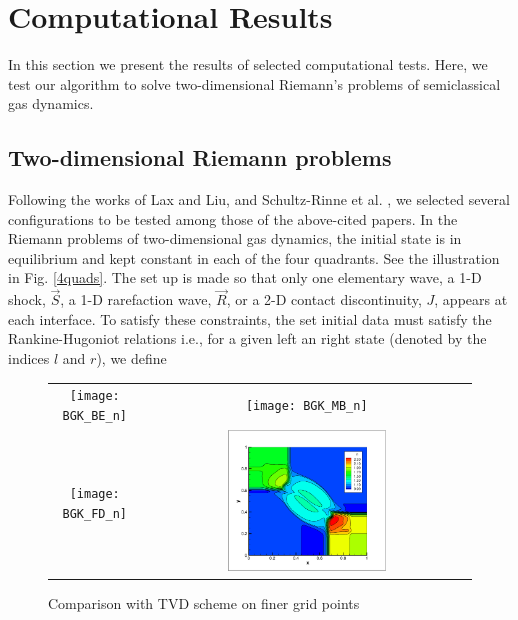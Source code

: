 \documentclass{rsproca}%
\begin{document}
\section{Computational Results}
\label{results}

In this section we present the results of selected computational tests.  Here, we test our algorithm to solve two-dimensional Riemann's problems of semiclassical gas dynamics.

\subsection{Two-dimensional Riemann problems}
\label{Riemannp}
Following the works of Lax and Liu, \cite{Laxliu95} and Schultz-Rinne et al. \cite{schultzrinne}, we selected several configurations to be tested among those of the above-cited papers. In the Riemann problems of two-dimensional gas dynamics, the initial state is in equilibrium and kept constant in each of the four quadrants. See the illustration in Fig. \ref{4quads}. The set up is made so that only one elementary wave, a 1-D  shock, $\vec{S}$, a 1-D rarefaction wave, $\vec{R}$, or a 2-D contact discontinuity, $J$, appears at each interface.
To satisfy these constraints, the set initial data must satisfy the Rankine-Hugoniot relations i.e., for a given left an right state (denoted by the indices $l$ and $r$), we define


\begin{figure}[hbt]
\centering
\begin{tabular}{cc}
\texttt{[image: BGK\_BE\_n]} \label{TVDp} & 
\texttt{[image: BGK\_MB\_n]} \label{WENOp} \\
\texttt{[image: BGK\_FD\_n]} \label{TVDp2} & 
\includegraphics[trim = 10mm 10mm 20mm 20mm,clip,width=0.5\textwidth]{ESBGK_MB_n} \label{WENOp2}
\end{tabular}
\caption{Comparison with TVD scheme on finer grid points}
\label{WENOTVD2D}
\end{figure}
\end{document}
